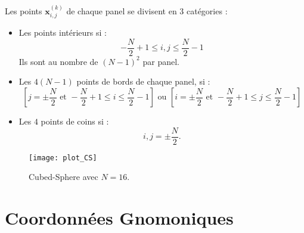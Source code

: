 Les points $\mathbf{x}_{i,j}^{(k)}$ de chaque panel se divisent en 3 catégories :
\begin{itemize}
\item Les points intérieurs si :
\begin{equation}
- \dfrac{N}{2}+1 \leq i,j \leq \dfrac{N}{2}-1
\end{equation}
Ils sont au nombre de $(N-1)^2$ par panel.
\item Les $4(N-1)$ points de bords de chaque panel, si :
\begin{equation}
\left[ j=\pm \dfrac{N}{2} \text{ et } - \dfrac{N}{2}+1 \leq i \leq \dfrac{N}{2}-1 \right] \text{ ou } \left[ i=\pm \dfrac{N}{2} \text{ et } - \dfrac{N}{2}+1 \leq j \leq \dfrac{N}{2}-1 \right]
\end{equation}
\item Les $4$ points de coins si :
\begin{equation}
i, j = \pm \dfrac{N}{2}.
\end{equation}
\end{itemize}



\begin{figure}
\begin{center}
\texttt{[image: plot\_CS]}
\end{center}
\caption{Cubed-Sphere avec $N=16$.}
\end{figure}















\section{Coordonnées Gnomoniques}

